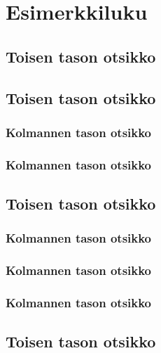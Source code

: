 \chapter{Esimerkkiluku}

\lipsum

\section{Toisen tason otsikko}

\lipsum[1-4]

\section{Toisen tason otsikko}

\lipsum[1-4]

\subsection{Kolmannen tason otsikko}

\lipsum[2]

\subsection{Kolmannen tason otsikko}

\lipsum[3]

\section{Toisen tason otsikko}

\lipsum[1]

\subsection{Kolmannen tason otsikko}

\lipsum[3]

\subsection{Kolmannen tason otsikko}

\lipsum[3]

\subsection{Kolmannen tason otsikko}

\lipsum[3]

\section{Toisen tason otsikko}

